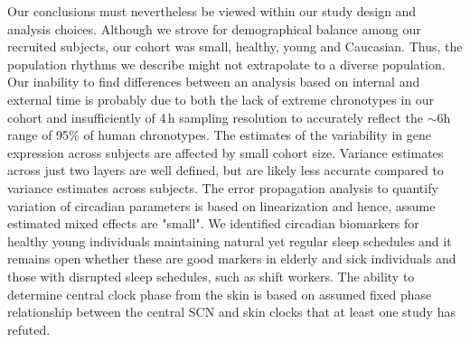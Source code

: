 Our conclusions must nevertheless be viewed within our study design and analysis choices. Although we strove for demographical balance among our recruited subjects, our cohort was small, healthy, young and Caucasian. Thus, the population rhythms we describe might not extrapolate to a diverse population. Our inability to find differences between an analysis based on internal and external time is probably due to both the lack of extreme chronotypes in our cohort and insufficiently of 4\,h sampling resolution to accurately reflect the $\sim$6h range of 95\% of human chronotypes. The estimates of the variability in gene expression across subjects are affected by small cohort size. Variance estimates across just two layers are well defined, but are likely less accurate compared to variance estimates across subjects. The error propagation analysis to quantify variation of circadian parameters is based on linearization and hence, assume estimated mixed effects are "small". We identified circadian biomarkers for healthy young individuals maintaining natural yet regular sleep schedules and it remains open whether these are good markers in elderly and sick individuals and those with disrupted sleep schedules, such as shift workers. The ability to determine central clock phase from the skin is based on assumed fixed phase relationship between the central SCN and skin clocks that at least one study \cite{Welz2019} has refuted.

